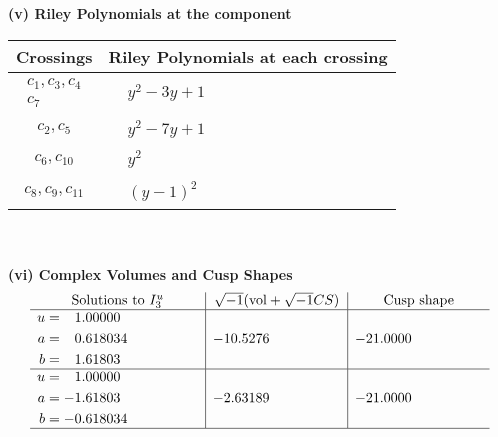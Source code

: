 \documentclass[1p]{elsarticle_modified}
\theoremstyle{definition}
\newcommand{\I}{\sqrt{-1}}
\begin{document}
\newpage\renewcommand{\arraystretch}{1}
\flushleft \textbf{(v) Riley Polynomials at the component}\newline \\
\begin{tabular}{m{50pt}|m{274pt}}
Crossings & \hspace{64pt}Riley Polynomials at each crossing \\
\hline $$\begin{aligned}c_{1},c_{3},c_{4}\\c_{7}\end{aligned}$$&$\begin{aligned}
&y^2-3 y+1
\end{aligned}$\\
\hline $$\begin{aligned}c_{2},c_{5}\end{aligned}$$&$\begin{aligned}
&y^2-7 y+1
\end{aligned}$\\
\hline $$\begin{aligned}c_{6},c_{10}\end{aligned}$$&$\begin{aligned}
&y^2
\end{aligned}$\\
\hline $$\begin{aligned}c_{8},c_{9},c_{11}\end{aligned}$$&$\begin{aligned}
&(y-1)^2
\end{aligned}$\\
\hline
\end{tabular}\\~\\
\newpage\flushleft \textbf{(vi) Complex Volumes and Cusp Shapes}
$$\begin{array}{c|c|c}  
\text{Solutions to }I^u_{3}& \I (\text{vol} + \sqrt{-1}CS) & \text{Cusp shape}\\
 \hline 
\begin{aligned}
u &= \phantom{-}1.00000\phantom{ +0.000000I} \\
a &= \phantom{-}0.618034\phantom{ +0.000000I} \\
b &= \phantom{-}1.61803\phantom{ +0.000000I}\end{aligned}
 & -10.5276\phantom{ +0.000000I} & -21.0000\phantom{ +0.000000I} \\ \hline\begin{aligned}
u &= \phantom{-}1.00000\phantom{ +0.000000I} \\
a &= -1.61803\phantom{ +0.000000I} \\
b &= -0.618034\phantom{ +0.000000I}\end{aligned}
 & -2.63189\phantom{ +0.000000I} & -21.0000\phantom{ +0.000000I}\\
 \hline 
 \end{array}$$\newpage
\end{document}
